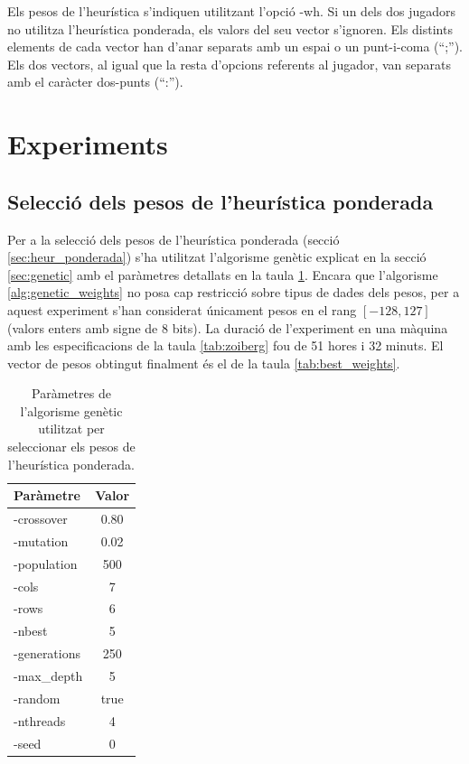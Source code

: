 \documentclass[12pt,a4paper]{article}
\begin{document}
Els pesos de l'heurística s'indiquen utilitzant l'opció -wh. Si un dels dos jugadors no utilitza l'heurística ponderada, els valors del seu vector s'ignoren. Els distints elements de cada vector han d'anar separats amb un espai o un punt-i-coma (``;''). Els dos vectors, al igual que la resta d'opcions referents al jugador, van separats amb el caràcter dos-punts (``:'').

\section{Experiments}
\subsection{Selecció dels pesos de l'heurística ponderada}
Per a la selecció dels pesos de l'heurística ponderada (secció \ref{sec:heur_ponderada}) s'ha utilitzat l'algorisme genètic explicat en la secció \ref{sec:genetic} amb el paràmetres detallats en la taula \ref{tab:genetic_init}. Encara que l'algorisme \ref{alg:genetic_weights} no posa cap restricció sobre tipus de dades dels pesos, per a aquest experiment s'han considerat únicament pesos en el rang $[-128, 127]$ (valors enters amb signe de 8 bits). La duració de l'experiment en una màquina amb les especificacions de la taula \ref{tab:zoiberg} fou de 51 hores i 32 minuts. El vector de pesos obtingut finalment és el de la taula \ref{tab:best_weights}.\\

\begin{table}[h]
\centering
\begin{tabular}{|l|c|}
\hline 
Paràmetre & Valor \\
\hline
-crossover & 0.80\\
-mutation & 0.02\\
-population & 500\\
-cols & 7\\
-rows  & 6\\
-nbest & 5\\
-generations & 250\\
-max\_depth & 5 \\
-random & true\\
-nthreads & 4\\
-seed & 0\\
\hline
\end{tabular}
\caption{Paràmetres de l'algorisme genètic utilitzat per seleccionar els pesos de l'heurística ponderada.}
\label{tab:genetic_init}
\end{table}
\end{document}
